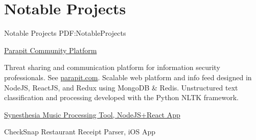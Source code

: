 
\section
{Notable Projects}
{Notable Projects}
{PDF:NotableProjects}

\BulletItem
\href{http://parapit.com}
{Parapit Community Platform}
\hfill
{}
\begin{detail}
\SubBulletItem
Threat sharing and communication platform for information security professionals. See \href{http://parapit.com}{parapit.com}.
\SubBulletItem
Scalable web platform and info feed designed in NodeJS, ReactJS, and Redux using MongoDB \& Redis. Unstructured text classification and processing developed with the Python NLTK framework. 
\end{detail}

\GapNoBreak
\BulletItem
\href{https://github.com/bekher/synesthesia}
{Synesthesia Music Processing Tool, NodeJS+React App}
\hfill
{}

\GapNoBreak
\BulletItem
CheckSnap Restaurant Receipt Parser, iOS App
\hfill
{}


